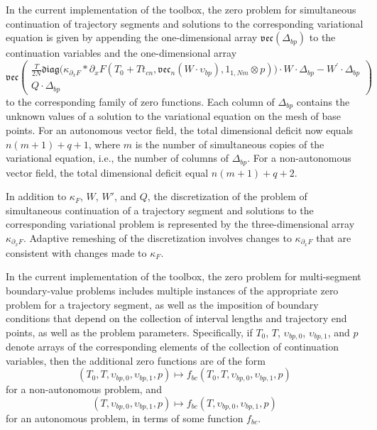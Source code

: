 In the current implementation of the  toolbox, the zero problem for simultaneous continuation of trajectory segments and solutions to the corresponding variational equation is given by appending the one-dimensional array $\mathfrak{vec}\left(\Delta_{bp}\right)$ to the continuation variables and the one-dimensional array
\begin{equation}
\mathfrak{vec}\begin{pmatrix}\frac{T}{2N}  \mathfrak{diag}\big(\kappa_{\partial_x F} * \partial_{x}F\left( T_0+Tt_{cn},\mathfrak{vec}_{n}\left( W\cdot \upsilon_{bp}\right),1_{1,Nm}\otimes p\right) \big) \cdot W\cdot\Delta_{bp}-W^{\prime }\cdot\Delta_{bp}\\Q\cdot\Delta_{bp}\end{pmatrix}
\end{equation}
to the corresponding family of zero functions. Each column of $\Delta_{bp}$ contains the unknown values of a solution to the variational equation on the mesh of base points.  For an autonomous vector field, the total dimensional deficit now equals $n(m+1)+q+1$, where $m$ is the number of simultaneous copies of the variational equation, i.e., the number of columns of $\Delta_{bp}$. For a non-autonomous vector field, the total dimensional deficit equal $n(m+1)+q+2$.
 
In addition to $\kappa_F$, $W$, $W'$, and $Q$, the discretization of the problem of simultaneous continuation of a trajectory segment and solutions to the corresponding variational problem is represented by the three-dimensional array $\kappa_{\partial_x F}$. Adaptive remeshing of the discretization involves changes to $\kappa_{\partial_x F}$ that are consistent with changes made to $\kappa_F$.

In the current implementation of the  toolbox, the zero problem for multi-segment boundary-value problems includes multiple instances of the appropriate zero problem for a trajectory segment, as well as the imposition of boundary conditions that depend on the collection of interval lengths and trajectory end points, as well as the problem parameters. Specifically, if $T_0$, $T$, $\upsilon_{bp,0}$, $\upsilon_{bp,1}$, and $p$ denote arrays of the corresponding elements of the collection of continuation variables, then the additional zero functions are of the form
\begin{equation}
\left(T_0,T,\upsilon_{bp,0},\upsilon_{bp,1},p\right)\mapsto f_{bc}\left(T_0,T,\upsilon_{bp,0},\upsilon_{bp,1},p\right)
\end{equation}
for a non-autonomous problem, and
\begin{equation}
\left(T,\upsilon_{bp,0},\upsilon_{bp,1},p\right)\mapsto f_{bc}\left(T,\upsilon_{bp,0},\upsilon_{bp,1},p\right)
\end{equation}
for an autonomous problem, in terms of some function $f_{bc}$.

